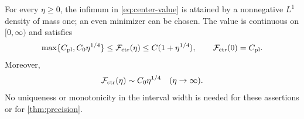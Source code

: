 \begin{proposition}
\label{prop:center-value}
For every $\eta\ge0$, the infimum in \eqref{eq:center-value} is
attained by a nonnegative $L^1$ density of mass one; an even
minimizer can be chosen. The value is continuous on $[0,\infty)$
and satisfies
\begin{equation}\label{eq:center-bounds}
 \max\{C_{\rm pl},C_0\eta^{1/4}\}
 \le\mathcal F_{\rm ctr}(\eta)\le C(1+\eta^{1/4}),
 \qquad
 \mathcal F_{\rm ctr}(0)=C_{\rm pl}.
\end{equation}
Moreover,
\begin{equation}\label{eq:center-large}
       \mathcal F_{\rm ctr}(\eta)\sim C_0\eta^{1/4}
                         \quad(\eta\to\infty).
\end{equation}
No uniqueness or monotonicity in the interval width is needed
for these assertions or for \cref{thm:precision}.
\end{proposition}
